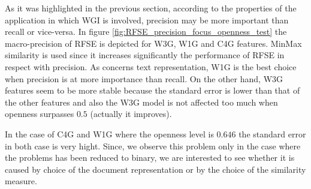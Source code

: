 \documentclass[runningheads]{llncs}
\begin{document}
%
%
%
%

As it was highlighted in the previous section, according to the properties of the application in which WGI is involved, precision may be more important than recall or vice-versa. In figure \ref{fig:RFSE_precision_focus_openness_test} the macro-precision of RFSE is depicted for W3G, W1G and C4G features. MinMax similarity is used since it increases significantly the performance of RFSE in respect with precision. As concerns text representation, W1G is the best choice when precision is at more importance than recall. On the other hand, W3G features seem to be more stable because the standard error is lower than that of the other features and also the W3G model is not affected too much when openness surpasses $0.5$ (actually it improves).


In the case of C4G and W1G where the openness level is $0.646$ the standard error in both case is very hight. Since, we observe this problem only in the case where the problems has been reduced to binary, we are interested to see whether it is caused by choice of the document representation or by the choice of the similarity measure.

\end{document}
